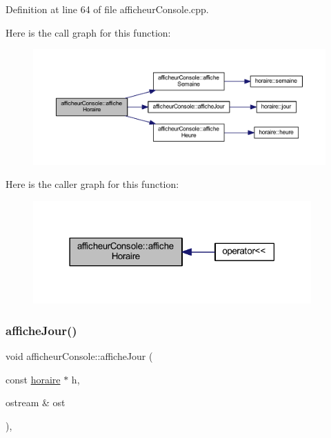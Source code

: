 Definition at line 64 of file afficheur\+Console.\+cpp.

Here is the call graph for this function\+:\nopagebreak
\begin{figure}[H]
\begin{center}
\leavevmode
\includegraphics[width=350pt]{classafficheur_console_a44e40b275c8b0b1a33cdc5bd46a31cf3_cgraph}
\end{center}
\end{figure}
Here is the caller graph for this function\+:\nopagebreak
\begin{figure}[H]
\begin{center}
\leavevmode
\includegraphics[width=302pt]{classafficheur_console_a44e40b275c8b0b1a33cdc5bd46a31cf3_icgraph}
\end{center}
\end{figure}
\hypertarget{classafficheur_console_a9d69206c3cd6409d1437ee546e71cf25}{}\label{classafficheur_console_a9d69206c3cd6409d1437ee546e71cf25} 
\subsubsection{\texorpdfstring{affiche\+Jour()}{afficheJour()}}
{\footnotesize\ttfamily void afficheur\+Console\+::affiche\+Jour (\begin{DoxyParamCaption}\item[{const \hyperlink{classhoraire}{horaire} $\ast$}]{h,  }\item[{ostream \&}]{ost }\end{DoxyParamCaption})\hspace{0.3cm}{\ttfamily [override]}, {\ttfamily [virtual]}}



